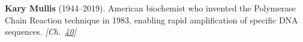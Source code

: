 \nobelchemistry \textbf{Kary Mullis} (1944–2019). American biochemist who invented the Polymerase Chain Reaction technique in 1983, enabling rapid amplification of specific DNA sequences. \emph{[Ch.~\hyperref[ch:dnasequencing]{40}]}

